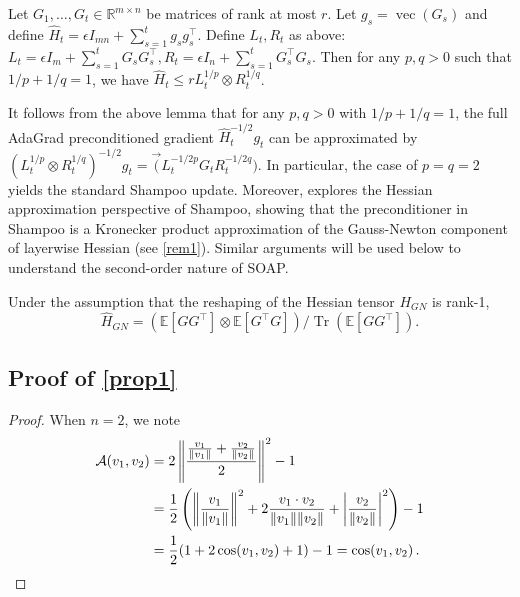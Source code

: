 \begin{lemma}
    \label{lemma: hessian}
    Let $G_1, \ldots, G_t \in \mathbb{R}^{m \times n}$ be matrices of rank at most $r$. Let $g_s=\operatorname{vec}\left(G_s\right)$ and define $\widehat{H}_t=\epsilon I_{m n}+\sum_{s=1}^t g_s g_s^{\top}$. Define $L_t, R_t$ as above: $L_t=\epsilon I_m+\sum_{s=1}^t G_s G_s^{\top}, R_t=\epsilon I_n+\sum_{s=1}^t G_s^{\top} G_s$. Then for any $p, q>0$ such that $1 / p+1 / q=1$, we have $\widehat{H}_t \leq r L_t^{1 / p} \otimes R_t^{1 / q}$.
\end{lemma}
It follows from the above lemma that 
for any $p, q>0$ with $1 / p+1 / q=1$,
the full AdaGrad preconditioned gradient $\widehat{H}_t^{-1 / 2}g_t$ can be approximated by $(L_t^{1 / p} \otimes R_t^{1 / q})^{-1 / 2} g_t = \Vec(L_t^{-1 / 2p} G_t R_t^{-1 / 2q})$. In particular, the case of $p=q=2$ yields the standard Shampoo update. 
Moreover, \cite{morwani2024new} explores the Hessian approximation perspective of Shampoo, showing that the preconditioner in Shampoo is a Kronecker product approximation of the Gauss-Newton component of layerwise Hessian (see \cref{rem1}). Similar arguments will be used below to understand the second-order nature of SOAP.  



\begin{lemma} 
\label{lemma: exact_h_gn}
Under the assumption that the reshaping of the Hessian tensor $H_{GN}$ is rank-1,
$$
\hat{H}_{GN} =\left(\mathbb{E}\left[G G^{\top}\right] \otimes \mathbb{E}\left[G^{\top} G\right]\right) / \operatorname{Tr}\left(\mathbb{E}\left[G G^{\top}\right]\right).
$$
\end{lemma}


\subsection{Proof of \cref{prop1}}
\label{proof: prop1}
\begin{proof}
    When $n=2$, we note 
\begin{align*}
\mathcal{A}(v_1, v_2) &= 2\left\|\frac{\frac{v_1}{\|v_1\|} + \frac{v_2}{\|v_2\|}}{2}\right\|^2 - 1 \notag \\
&= \frac{1}{2}\left(\left\|\frac{v_1}{\|v_1\|}\right\|^2 + 2\frac{v_1 \cdot v_2}{\|v_1\|\|v_2\|} + \left|\frac{v_2}{\|v_2\|}\right|^2\right) - 1  \notag \\
&= \frac{1}{2}(1 + 2\cos(v_1, v_2) + 1) - 1  = \cos(v_1, v_2)\,. \qedhere
\end{align*} 
\end{proof}

